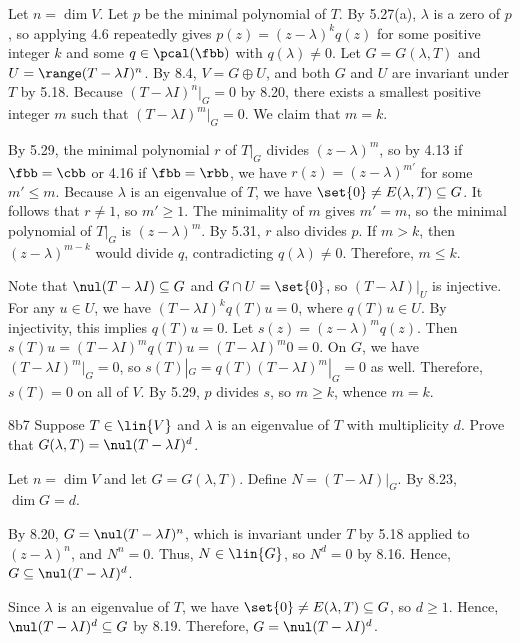 \begin{sol}
    Let $n = \dim V$.
    Let $p$ be the minimal polynomial of $T$.
    By 5.27(a), $\lambda$ is a zero of $p$, so applying 4.6 repeatedly gives $p(z) = (z - \lambda)^k q(z)$ for some positive integer $k$ and some $q \in \pcal(\fbb)$ with $q(\lambda) \neq 0$.  
    Let $G = G(\lambda, T)$ and $U = \range(T - \lambda I)^n$.
    By 8.4, $V = G \oplus U$, and both $G$ and $U$ are invariant under $T$ by 5.18.
    Because $(T - \lambda I)^n|_G = 0$ by 8.20, there exists a smallest positive integer $m$ such that $(T - \lambda I)^m|_G = 0$.
    We claim that $m = k$.

    \rightineq By 5.29, the minimal polynomial $r$ of $T|_G$ divides $(z - \lambda)^m$, so by 4.13 if $\fbb = \cbb$ or 4.16 if $\fbb = \rbb$, we have $r(z) = (z - \lambda)^{m'}$ for some $m' \leq m$.
    Because $\lambda$ is an eigenvalue of $T$, we have $\set{0} \neq E(\lambda, T) \subseteq G$.
    It follows that $r \neq 1$, so $m' \geq 1$.
    The minimality of $m$ gives $m' = m$, so the minimal polynomial of $T|_G$ is $(z - \lambda)^m$.
    By 5.31, $r$ also divides $p$.
    If $m > k$, then $(z - \lambda)^{m-k}$ would divide $q$, contradicting $q(\lambda) \neq 0$.
    Therefore, $m \leq k$.
    
    \leftineq Note that $\nul(T - \lambda I) \subseteq G$ and $G \cap U = \set{0}$, so $(T - \lambda I)|_U$ is injective.
    For any $u \in U$, we have $(T - \lambda I)^k q(T) u = 0$, where $q(T) u \in U$.
    By injectivity, this implies $q(T) u = 0$.
    Let $s(z) = (z - \lambda)^m q(z)$.
    Then $s(T) u = (T - \lambda I)^m q(T) u = (T - \lambda I)^m 0 = 0$.
    On $G$, we have $(T - \lambda I)^m|_G = 0$, so $s(T)|_G = q(T) (T - \lambda I)^m|_G = 0$ as well.
    Therefore, $s(T) = 0$ on all of $V$.
    By 5.29, $p$ divides $s$, so $m \geq k$, whence $m = k$.
\end{sol}

\begin{exercise}{8b7}
    Suppose $T \in \lin{V}$ and $\lambda$ is an eigenvalue of $T$ with multiplicity $d$.
    Prove that $G(\lambda, T) = \nul(T - \lambda I)^d$.

\end{exercise}

\begin{sol}
    Let $n = \dim V$ and let $G = G(\lambda, T)$.
    Define $N = (T - \lambda I)|_G$.
    By 8.23, $\dim G = d$.

    \rightset By 8.20, $G = \nul(T - \lambda I)^n$, which is invariant under $T$ by 5.18 applied to $(z - \lambda)^n$, and $N^n = 0$.
    Thus, $N \in \lin{G}$, so $N^d = 0$ by 8.16.
    Hence, $G \subseteq \nul(T - \lambda I)^d$.

    \leftset Since $\lambda$ is an eigenvalue of $T$, we have $\set{0} \neq E(\lambda, T) \subseteq G$, so $d \geq 1$.
    Hence, $\nul(T - \lambda I)^d \subseteq G$ by 8.19.
    Therefore, $G = \nul(T - \lambda I)^d$.
\end{sol}

